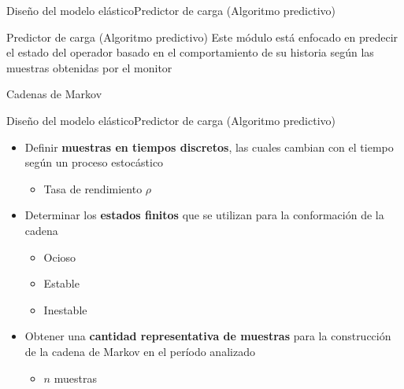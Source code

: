 \begin{frame}{Diseño del modelo elástico}{Predictor de carga (Algoritmo predictivo)}
\begin{block}{Predictor de carga (Algoritmo predictivo)}
	Este módulo está enfocado en predecir el estado del operador basado en el comportamiento de su historia según las muestras obtenidas por el monitor
\end{block}

\pause
\begin{alertblock}{}
	\centering
	Cadenas de Markov
\end{alertblock}
\end{frame}

\begin{frame}{Diseño del modelo elástico}{Predictor de carga (Algoritmo predictivo)}
\begin{itemize}
	\item Definir \textbf{muestras en tiempos discretos}, las cuales cambian con el tiempo según un proceso estocástico
	\begin{itemize}
		\item Tasa de rendimiento $\rho$
	\end{itemize}
	\item Determinar los \textbf{estados finitos} que se utilizan para la conformación de la cadena
	\begin{itemize}
		\item Ocioso
		\item Estable
		\item Inestable
	\end{itemize}
	\item Obtener una \textbf{cantidad representativa de muestras} para la construcción de la cadena de Markov en el período analizado
	\begin{itemize}
		\item $n$ muestras
	\end{itemize}
\end{itemize}

\end{frame}


